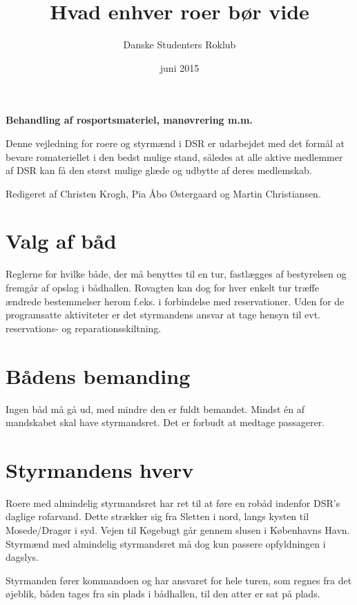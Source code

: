 \documentclass{article}
\title{Hvad enhver roer bør vide}
\author{Danske Studenters Roklub}
\date{juni 2015}
\begin{document}
\maketitle
\begin{center}
    \textbf{Behandling af rosportsmateriel, manøvrering m.m.}
\end{center}

Denne vejledning for roere og styrmænd i DSR er udarbejdet med det formål at
bevare romateriellet i den bedst mulige stand, således at alle aktive medlemmer
af DSR kan få den størst mulige glæde og udbytte af deres medlemskab.

\vfill


Redigeret af Christen Krogh, Pia Åbo Østergaard og Martin Christiansen.

\newpage

\tableofcontents


\section{Valg af båd}%

Reglerne for hvilke både, der må benyttes til en tur, fastlægges af bestyrelsen
og fremgår af opslag i bådhallen. Rovagten kan dog for hver enkelt tur træffe
ændrede bestemmelser herom f.eks. i forbindelse med reservationer. Uden for de
programsatte aktiviteter er det styrmandens ansvar at tage hensyn til evt.
reservations- og reparationsskiltning.

\section{Bådens bemanding}

Ingen båd må gå ud, med mindre den er fuldt bemandet. Mindst én af
mandskabet skal have styrmandsret. Det er forbudt at medtage passagerer.

\section{Styrmandens hverv}

Roere med almindelig styrmandsret har ret til at føre en robåd indenfor
DSR's daglige rofarvand. Dette strækker sig fra Sletten i nord, langs
kysten til Mosede/Dragør i syd. Vejen til Køgebugt går gennem slusen i
Københavns Havn. Styrmænd med almindelig styrmandsret må dog kun passere
opfyldningen i dagslys.

Styrmanden fører kommandoen og har ansvaret for hele turen, som regnes
fra det øjeblik, båden tages fra sin plads i bådhallen, til den atter er
sat på plads.
\end{document}
